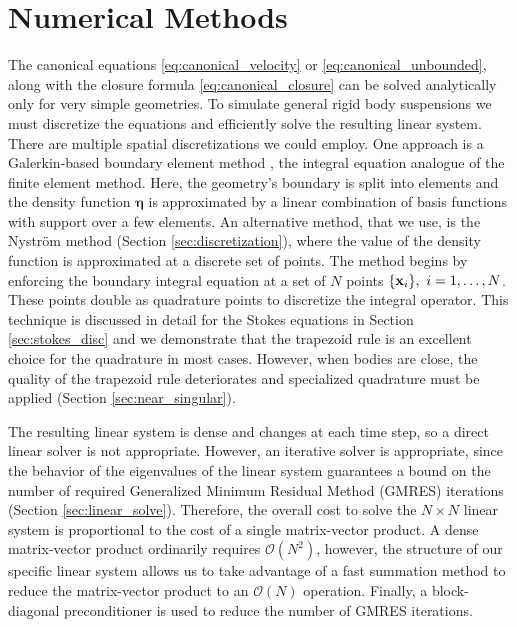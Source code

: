 \chapter{Numerical Methods}\label{chap:numerics}

The canonical equations \eqref{eq:canonical_velocity} or \eqref{eq:canonical_unbounded}, along with the closure formula \eqref{eq:canonical_closure} can be solved analytically only for very simple geometries. To simulate general rigid body suspensions we must discretize the equations and efficiently solve the resulting linear system. There are multiple spatial discretizations we could employ. One approach is a Galerkin-based boundary element method \cite{Karrila1991, Hsiao2006}, the integral equation analogue of the finite element method. Here, the geometry's boundary is split into elements and the density function $\bm{\eta}$ is approximated by a linear combination of basis functions with support over a few elements. An alternative method, that we use, is the Nystr\"{o}m method (Section \ref{sec:discretization}), where the value of the density function is approximated at a discrete set of points. The method begins by enforcing the boundary integral equation at a set of $N$ points $\{{\mathbf{x}}_i\},~i=1,\hdots,N$. These points double as quadrature points to discretize the integral operator. This technique is discussed in detail for the Stokes equations in Section \ref{sec:stokes_disc} and we demonstrate that the trapezoid rule is an excellent choice for the quadrature in most cases. However, when bodies are close, the quality of the trapezoid rule deteriorates and specialized quadrature must be applied (Section \ref{sec:near_singular}). 

The resulting linear system is dense and changes at each time step, so a direct linear solver is not appropriate. However, an iterative solver is appropriate, since the behavior of the eigenvalues of the linear system guarantees a bound on the number of required  Generalized Minimum Residual Method (GMRES) iterations (Section \ref{sec:linear_solve}). Therefore, the overall cost to solve the $N\times N$ linear system is proportional to the cost of a single matrix-vector product. A dense matrix-vector product ordinarily requires $\mathcal{O}(N^2)$, however, the structure of our specific linear system allows us to take advantage of a fast summation method to reduce the matrix-vector product to an $\mathcal{O}(N)$ operation. Finally, a block-diagonal preconditioner is used to reduce the number of GMRES iterations.

